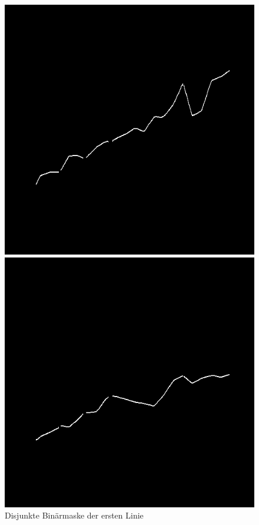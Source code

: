 \begin{figure}[H] %
    \centering
    \begin{minipage}{0.315\textwidth} %
        \centering
        \includegraphics[width=\linewidth]{Implementation/img/alg_layer1.png}
        \caption{ Disjunkte Binärmaske der ersten Linie}
        \label{fig:alg_layer1}
    \end{minipage}\hfill %
    \begin{minipage}{0.315\textwidth} %
        \centering
        \includegraphics[width=\linewidth]{Implementation/img/alg_layer2.png}

\end{minipage}
\end{figure}
